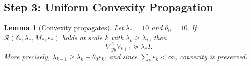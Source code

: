 \documentclass[11pt]{article}
\newtheorem{lemma}[theorem]{Lemma}
\theoremstyle{definition}
\newcommand{\1}{\mathbf{1}}
\begin{document}
\subsection{Step 3: Uniform Convexity Propagation}

\begin{lemma}[Convexity propagates]\label{lem:step3-convexity}
Let $\lambda_* = 10$ and $\theta_0 = 10$. If $\mathcal{R}(\delta_*, \lambda_*, M_*, \varepsilon_*)$ 
holds at scale $k$ with $\lambda_k \ge \lambda_*$, then
\begin{equation}\label{eq:step3-bound}
\nabla^2_{yy} V_{k+1} \succeq \lambda_* I.
\end{equation}
More precisely, $\lambda_{k+1} \ge \lambda_k - \theta_0 \varepsilon_k$, and since 
$\sum_k \varepsilon_k < \infty$, convexity is preserved.
\end{lemma}
\end{document}
